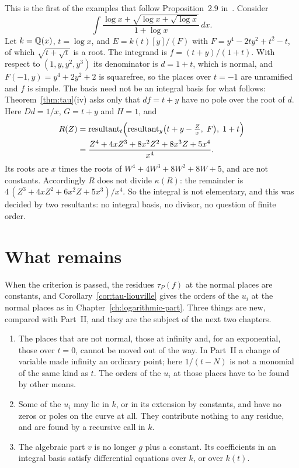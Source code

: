 \begin{example}\label{ex:criterion-fails}
This is the first of the examples that follow Proposition~2.9
in~\cite{bronstein1990}. Consider
\[
  \int \frac{\log x + \sqrt{\log x + \sqrt{\log x}}}{1 + \log x}\, dx .
\]
Let $k = \mathbb{Q}(x)$, $t = \log x$, and $E = k(t)[y]/(F)$ with $F = y^4 - 2 t y^2 +
t^2 - t$, of which $\sqrt{t + \sqrt t}$ is a root. The integrand is $f = (t +
y)/(1 + t)$. With respect to $(1, y, y^2, y^3)$ its denominator is $d = 1 +
t$, which is normal, and $F(-1, y) = y^4 + 2y^2 + 2$ is squarefree, so the
places over $t = -1$ are unramified and $f$ is simple. The basis need not be
an integral basis for what follows: Theorem~\ref{thm:tau}(iv) asks only that
$d f = t + y$ have no pole over the root of $d$. Here $Dd = 1/x$, $G =
t + y$ and $H = 1$, and
\begin{align*}
  R(Z) &= \operatorname{resultant}_t\Bigl( \operatorname{resultant}_y\bigl( t + y - \tfrac{Z}{x},\; F \bigr),\; 1 + t \Bigr) \\
       &= \frac{Z^4 + 4x Z^3 + 8x^2 Z^2 + 8x^3 Z + 5x^4}{x^4} .
\end{align*}
Its roots are $x$ times the roots of $W^4 + 4W^3 + 8W^2 + 8W + 5$, and are not
constants. Accordingly $R$ does not divide $\kappa(R)$: the remainder is
$4\,(Z^3 + 4x Z^2 + 6x^2 Z + 5x^3)/x^4$. So the integral is not elementary, and
this was decided by two resultants: no integral basis, no divisor, no
question of finite order.
\end{example}

\section{What remains}\label{sec:mono-remains}

When the criterion is passed, the residues $\tau_P(f)$ at the normal places
are constants, and Corollary~\ref{cor:tau-liouville} gives the orders of the
$u_i$ at the normal places as in Chapter~\ref{ch:logarithmic-part}. Three
things are new, compared with Part~II, and they are the subject of the next
two chapters.
\begin{enumerate}
\item The places that are not normal, those at infinity and, for an
  exponential, those over $t = 0$, cannot be moved out of the way. In
  Part~II a change of variable made infinity an ordinary point; here $1/(t -
  N)$ is not a monomial of the same kind as $t$. The orders of the $u_i$ at
  those places have to be found by other means.
\item Some of the $u_i$ may lie in $k$, or in its extension by constants, and have no zeros or
  poles on the curve at all. They contribute nothing to any residue, and
  are found by a recursive call in $k$.
\item The algebraic part $v$ is no longer $g$ plus a constant. Its
  coefficients in an integral basis satisfy differential equations over $k$,
  or over $k(t)$.
\end{enumerate}

